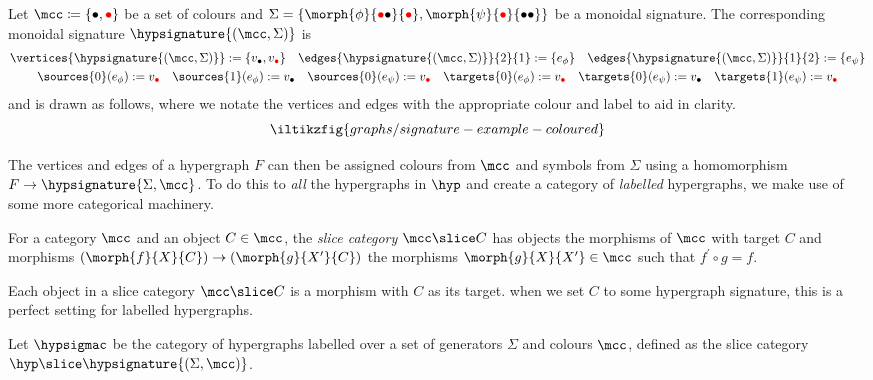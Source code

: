 \begin{example}\label{ex:labelled-hypergraph}
    Let \(\mcc \coloneqq \{\bullet,\redbullet\}\) be a set of colours and
    \(\Sigma = \{\morph{\phi}{\redbullet\bullet}{\redbullet}, \morph{\psi}{\redbullet}{\bullet\bullet}\}\) be a monoidal
    signature.
    The corresponding monoidal signature \(\hypsignature{(\mcc,\Sigma)}\) is
    \begin{gather*}
        \vertices{\hypsignature{(\mcc,\Sigma)}} := \{v_{\bullet},v_{\redbullet}\}
        \quad
        \edges{\hypsignature{(\mcc,\Sigma)}}{2}{1} := \{e_\phi\}
        \quad
        \edges{\hypsignature{(\mcc,\Sigma)}}{1}{2} := \{e_\psi\}
        \\
        \sources{0}(e_\phi) := v_{\redbullet}
        \quad
        \sources{1}(e_\phi) := v_{\bullet}
        \quad
        \sources{0}(e_\psi) := v_{\redbullet}
        \quad
        \targets{0}(e_\phi) := v_{\redbullet}
        \quad
        \targets{0}(e_\psi) := v_{\bullet}
        \quad
        \targets{1}(e_\psi) := v_{\redbullet}
    \end{gather*}
    and is drawn as follows, where we notate the vertices and edges with the
    appropriate colour and label to aid in clarity.
    \[
        \iltikzfig{graphs/signature-example-coloured}
    \]
\end{example}

The vertices and edges of a hypergraph \(F\) can then be assigned colours from
\(\mcc\) and symbols from \(\Sigma\) using a homomorphism
\(F \to \hypsignature{\Sigma,\mcc}\).
To do this to \emph{all} the hypergraphs in \(\hyp\) and create a category of
\emph{labelled} hypergraphs, we make use of some more categorical machinery.

\begin{definition}
    For a category \(\mcc\) and an object \(C \in \mcc\), the
    \emph{slice category} \(\mcc \slice C\) has objects the morphisms of
    \(\mcc\) with target \(C\) and morphisms
    \((\morph{f}{X}{C}) \to (\morph{g}{X^\prime}{C})\) the morphisms
    \(\morph{g}{X}{X^\prime} \in \mcc\) such that \(f^\prime\circ g = f\).
\end{definition}

Each object in a slice category \(\mcc \slice C\) is a morphism with \(C\) as
its target.
when we set \(C\) to some hypergraph signature, this is a perfect setting for
labelled hypergraphs.

\begin{definition}
    Let \(\hypsigmac\) be the category of hypergraphs labelled over a set of
    generators \(\Sigma\) and colours \(\mcc\), defined as the slice category
    \(\hyp \slice \hypsignature{(\Sigma, \mcc)}\).
\end{definition}

